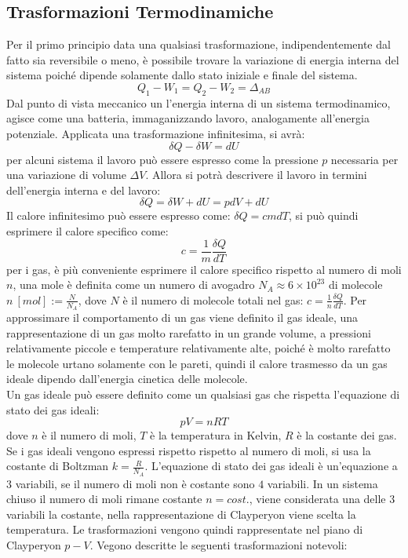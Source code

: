 \documentclass{article}
\numberwithin{equation}{subsection}
\begin{document}
\subsection{Trasformazioni Termodinamiche}
Per il primo principio data una qualsiasi trasformazione, 
indipendentemente dal fatto sia reversibile o meno, è 
possibile trovare la variazione di energia interna del 
sistema
poiché dipende solamente dallo stato iniziale e finale del sistema. 
\begin{equation}
    Q_1-W_1=Q_2-W_2=\Delta_{AB}
\end{equation}
Dal punto di vista meccanico un l'energia interna di un 
sistema termodinamico, agisce 
come una batteria, immaganizzando lavoro, analogamente all'energia potenziale. 
Applicata una trasformazione infinitesima, si avrà:
\begin{equation}
    \delta Q-\delta W=dU
\end{equation}
per alcuni sistema il lavoro può essere espresso come la 
pressione $p$ necessaria per una variazione di volume $\Delta V$. 
Allora si potrà descrivere il lavoro in termini dell'energia 
interna e del lavoro:
\begin{equation}
    \delta Q=\delta W+dU=pdV+dU
\end{equation}
Il calore infinitesimo può essere espresso come: $\delta Q=cmdT$, 
si può quindi esprimere il calore specifico come:
\begin{equation}
    c=\displaystyle\frac{1}{m}\frac{\delta Q}{dT}
\end{equation}
per i gas, è più conveniente esprimere il calore specifico 
rispetto al numero di moli $n$, una mole è definita come un numero 
di avogadro $N_A\approx 6\times10^{23}$ di molecole $n\:[mol]:=\displaystyle\frac{N}{N_A}$, 
dove $N$ è il numero di molecole totali nel gas: $c=\displaystyle\frac{1}{n}\frac{\delta Q}{dT}$. 
Per approssimare il comportamento di un gas viene definito 
il gas ideale, una rappresentazione di un gas molto 
rarefatto in un grande volume, a pressioni relativamente piccole 
e temperature relativamente alte, poiché è molto rarefatto le 
molecole urtano solamente con le pareti, quindi il calore 
trasmesso da un gas ideale dipendo dall'energia cinetica delle 
molecole. \\
Un gas ideale può essere definito come un qualsiasi gas 
che rispetta l'equazione di stato dei gas ideali:
\begin{equation}
    pV=nRT
\end{equation}
dove $n$ è il numero di moli, $T$ è la temperatura in Kelvin, 
$R$ è la costante dei gas. Se i gas ideali vengono espressi 
rispetto rispetto al numero di moli, si usa la costante di 
Boltzman $k=\displaystyle\frac{R}{N_A}$. 
L'equazione di stato dei gas ideali è un'equazione a $3$ 
variabili, se il numero di moli non è costante sono $4$ 
variabili. In un sistema chiuso il numero di moli 
rimane costante $n=cost.$, viene considerata una delle $3$ variabili 
la costante, nella rappresentazione di Clayperyon viene scelta 
la temperatura. Le trasformazioni vengono quindi rappresentate 
nel piano di Clayperyon $p-V$. 
Vegono descritte le seguenti trasformazioni notevoli:
\end{document}
